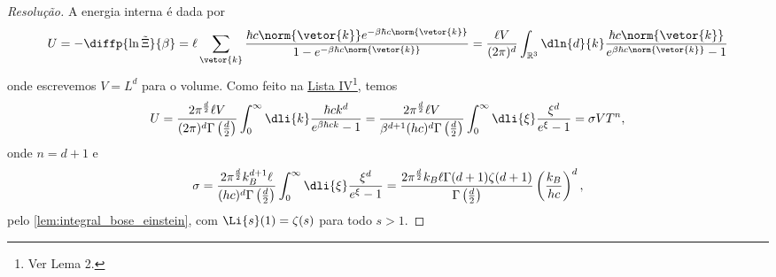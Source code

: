 \begin{proof}[Resolução]
    A energia interna é dada por
    \begin{equation*}
        U = - \diffp{\ln \tilde\Xi}{\beta} = \ell \sum_{\vetor{k}} \frac{\hbar c \norm{\vetor{k}} e^{-\beta \hbar c \norm{\vetor{k}}}}{1 - e^{-\beta \hbar c \norm{\vetor{k}}}} = \frac{\ell V}{(2\pi)^d} \int_{\mathbb{R}^3}\dln{d}{k} \frac{\hbar c \norm{\vetor{k}}}{e^{\beta \hbar c \norm{\vetor{k}}}-1}
    \end{equation*}
    onde escrevemos \(V = L^d\) para o volume. Como feito na \href{https://github.com/louisradial/4302401-mecanica-estatistica/releases/tag/lista4}{Lista IV}\footnote{Ver Lema 2.}, temos
    \begin{equation*}
        U = \frac{2\pi^{\frac{d}{2}}\ell V}{(2\pi)^d \Gamma\left(\frac{d}{2}\right)} \int_0^\infty \dli{k} \frac{\hbar c k^d}{e^{\beta \hbar c k}-1} = \frac{2\pi^{\frac{d}{2}} \ell V}{\beta^{d + 1}(h c)^d \Gamma\left(\frac{d}{2}\right)} \int_0^\infty \dli{\xi} \frac{\xi^d}{e^\xi - 1} = \sigma V T^{n},
    \end{equation*}
    onde \(n = d + 1\) e
    \begin{equation*}
        \sigma = \frac{2\pi^{\frac{d}{2}} k_B^{d + 1}\ell}{(hc)^d \Gamma\left(\frac{d}{2}\right)}\int_0^\infty \dli{\xi} \frac{\xi^d}{e^{\xi} - 1} = \frac{2\pi^{\frac{d}{2}}k_B \ell \Gamma(d + 1) \zeta(d + 1)}{\Gamma\left(\frac{d}{2}\right)} \left(\frac{k_B}{hc}\right)^d,
    \end{equation*}
    pelo \cref{lem:integral_bose_einstein}, com \(\Li{s}(1) = \zeta(s)\) para todo \(s > 1\).
\end{proof}
